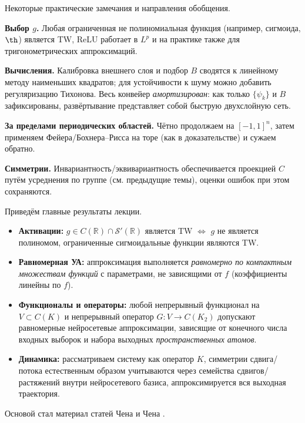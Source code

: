 \documentclass[../NDCNNAI_main.tex]{subfiles}
\begin{document}

\begin{remarks}
Некоторые практические замечания и направления обобщения.

\textbf{Выбор \( g \).} Любая ограниченная не полиномиальная функция (например, сигмоида, $\th$) является TW, ReLU работает в \( L^p \) и на практике также для тригонометрических аппроксимаций.

\textbf{Вычисления.} Калибровка внешнего слоя и подбор \( B \) сводятся к линейному методу наименьших квадратов; для устойчивости к шуму можно добавить регуляризацию Тихонова. Весь конвейер \textit{амортизирован}: как только \( \{\psi_k\} \) и \( B \) зафиксированы, развёртывание представляет собой быструю двухслойную сеть.

\textbf{За пределами периодических областей.} Чётно продолжаем на \([-1, 1]^n\), затем применяем Фейера/Бохнера–Рисса на торе (как в доказательстве) и сужаем обратно.

\textbf{Симметрии.} Инвариантность/эквивариантность обеспечивается проекцией \( C \) путём усреднения по группе (см. предыдущие темы), оценки ошибок при этом сохраняются.
\end{remarks}

Приведём главные результаты лекции.
\begin{itemize}
\item  \textbf{Активации:} \( g \in C(\mathbb{R}) \cap \mathcal{S}'(\mathbb{R}) \) является TW \( \iff \) \( g \) не является полиномом, ограниченные сигмоидальные функции являются TW.

\item  \textbf{Равномерная УА:} аппроксимация выполняется \textit{равномерно по компактным множествам функций} с параметрами, не зависящими от \( f \) (коэффициенты линейны по \( f \)).

\item \textbf{Функционалы и операторы:} любой непрерывный функционал на \( V \subset C(K) \) и непрерывный оператор \( G \colon V \to C(K_2) \) допускают равномерные нейросетевые аппроксимации, зависящие от конечного числа входных выборок и набора выходных \textit{пространственных атомов}.

\item \textbf{Динамика:} рассматриваем систему как оператор \( K \), симметрии сдвига/потока естественным образом учитываются через семейства сдвигов/растяжений внутри нейросетевого базиса, аппроксимируется вся выходная траектория.
\end{itemize}
Основой стал материал статей Чена и Чена \cite{Chen1995, Chen1993, Chen1993a}.
\end{document}

